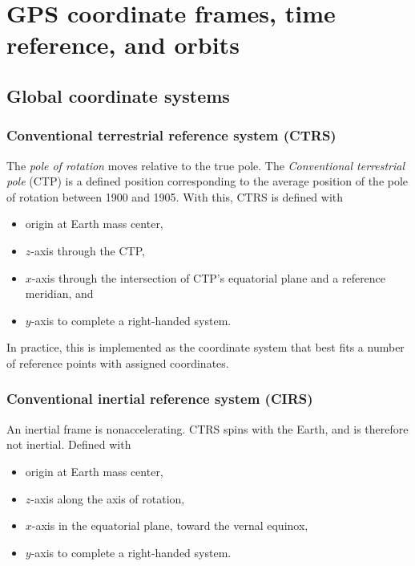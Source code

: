 \section{GPS coordinate frames, time reference, and orbits}

\subsection{Global coordinate systems}

\subsubsection{Conventional terrestrial reference system (CTRS)}
The \emph{pole of rotation} moves relative to the true pole. The \emph{Conventional terrestrial pole} (CTP) is a defined position corresponding to the average position of the pole of rotation between 1900 and 1905. With this, CTRS is defined with
\begin{itemize}
    \item origin at Earth mass center,
    \item $z$-axis through the CTP,
    \item $x$-axis through the intersection of CTP's equatorial plane and a reference meridian, and
    \item $y$-axis to complete a right-handed system.
\end{itemize}

In practice, this is implemented as the coordinate system that best fits a number of reference points with assigned coordinates.

\subsubsection{Conventional inertial reference system (CIRS)}
An inertial frame is nonaccelerating. CTRS spins with the Earth, and is therefore not inertial. Defined with
\begin{itemize}
    \item origin at Earth mass center,
    \item $z$-axis along the axis of rotation,
    \item $x$-axis in the equatorial plane, toward the vernal equinox,
    \item $y$-axis to complete a right-handed system.
\end{itemize}

